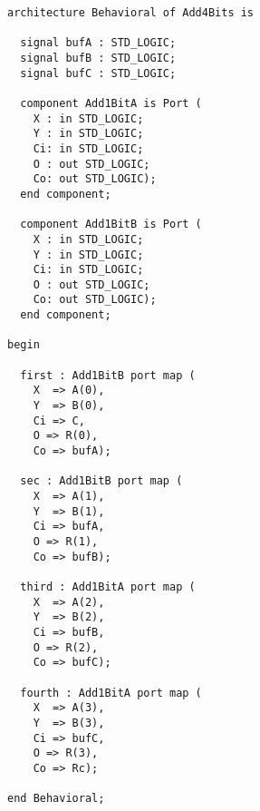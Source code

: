 \begin{verbatim}
architecture Behavioral of Add4Bits is

  signal bufA : STD_LOGIC;
  signal bufB : STD_LOGIC;
  signal bufC : STD_LOGIC;

  component Add1BitA is Port (
    X : in STD_LOGIC;
    Y : in STD_LOGIC;
    Ci: in STD_LOGIC;
    O : out STD_LOGIC;
    Co: out STD_LOGIC);
  end component;

  component Add1BitB is Port (
    X : in STD_LOGIC;
    Y : in STD_LOGIC;
    Ci: in STD_LOGIC;
    O : out STD_LOGIC;
    Co: out STD_LOGIC);
  end component;

begin

  first : Add1BitB port map (
    X  => A(0),
    Y  => B(0),
    Ci => C,
    O => R(0),
    Co => bufA);

  sec : Add1BitB port map (
    X  => A(1),
    Y  => B(1),
    Ci => bufA,
    O => R(1),
    Co => bufB);

  third : Add1BitA port map (
    X  => A(2),
    Y  => B(2),
    Ci => bufB,
    O => R(2),
    Co => bufC);

  fourth : Add1BitA port map (
    X  => A(3),
    Y  => B(3),
    Ci => bufC,
    O => R(3),
    Co => Rc);

end Behavioral;
\end{verbatim}
